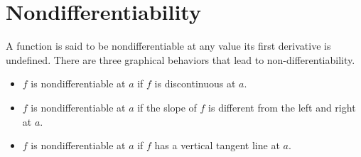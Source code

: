 \documentclass[12pt,]{book}
\theoremstyle{plain}
\theoremstyle{definition}
\numberwithin{equation}{section}
\begin{document}
\section[Nondifferentiability]{Nondifferentiability}\label{section-nondifferentiability}
A function is said to be nondifferentiable at any value its first derivative is undefined.  There are three graphical behaviors that lead to non-differentiability.%
\begin{itemize}[label=\textbullet]
\item{}\(f\) is nondifferentiable at \(a\) if \(f\) is discontinuous at \(a\).\item{}\(f\) is nondifferentiable at \(a\) if the slope of \(f\) is different from the left and right at \(a\).\item{}\(f\) is nondifferentiable at \(a\) if \(f\) has a vertical tangent line at \(a\).\end{itemize}
\typeout{************************************************}
\typeout{************************************************}
\end{document}
